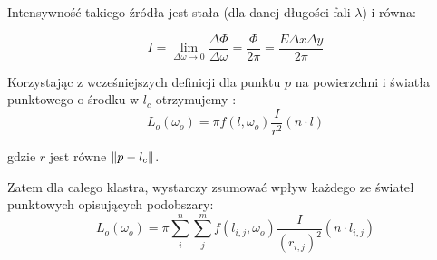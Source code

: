 \documentclass[../main.tex]{subfiles}
\begin{document}
Intensywność takiego źródła jest stała (dla danej długości fali $\lambda$) i równa: 

\[
  I 
	= \lim_{\Delta\omega \rightarrow 0} {
		\frac{\Delta\Phi}{\Delta\omega}
	} 
	= \frac{\Phi}{2\pi}
	= \frac{E\Delta{x}\Delta{y}}{2\pi}
\]

Korzystając z wcześniejszych definicji dla punktu $p$ na powierzchni i światła punktowego o środku w $l_c$ otrzymujemy \cite{pbr_frostbite}:
\[
	L_o(\omega_o) = \pi f(l, \omega_o) \frac{I}{r^2} (n \cdot l)
\]

\noindent gdzie $r$ jest równe $\norm{p-l_c}$.

Zatem dla całego klastra, wystarczy zsumować wpływ każdego ze świateł punktowych opisujących podobszary:
\[
	L_o(\omega_o) = \pi \sum_{i}^{n} \sum_{j}^{m} {
		f(l_{i,j}, \omega_o) \frac{I}{(r_{i,j})^2} (n \cdot l_{i,j})
	}
\]
\end{document}
